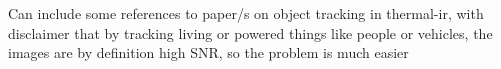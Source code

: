 \cite{Vidas2012}

Can include some references to paper/s on object tracking in thermal-ir, with disclaimer that by tracking living or powered things like people or vehicles, the images are by definition high SNR, so the problem is much easier